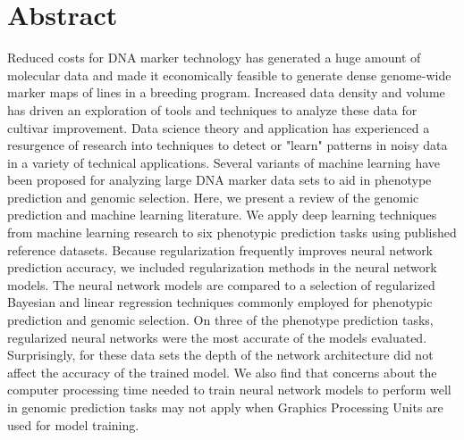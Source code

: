 \chapter*{Abstract}

Reduced costs for DNA marker technology has generated a huge amount of
molecular data and made it economically feasible to generate dense
genome-wide marker maps of lines in a breeding program. Increased
data density and volume has driven an exploration of tools and techniques
to analyze these data for cultivar improvement. Data science theory and 
application has experienced a resurgence of research into 
techniques to detect or "learn" patterns in noisy 
data in a variety of technical applications. Several variants of
machine learning have been proposed for analyzing large DNA marker
data sets to aid in phenotype prediction and genomic selection.
Here, we present a review of the genomic prediction and machine learning literature. 
We apply deep learning techniques from machine learning research to six 
phenotypic prediction tasks using published reference datasets. Because regularization 
frequently improves neural network prediction accuracy, we included regularization 
methods in the neural network models. 
The neural network models are compared to a selection of regularized Bayesian and 
linear regression techniques commonly employed for phenotypic prediction and 
genomic selection. On three of the phenotype prediction tasks, regularized neural networks 
were the most accurate of the models evaluated. Surprisingly, for these data sets the
depth of the network architecture did not affect the accuracy of 
the trained model. We also find that concerns about the computer processing 
time needed to train neural network models to perform well in genomic prediction 
tasks may not apply when Graphics Processing Units are used for model training.



